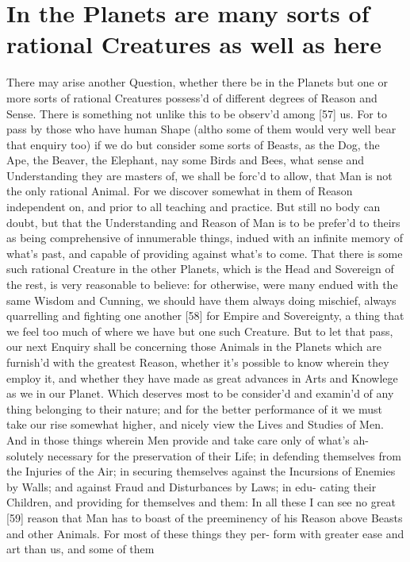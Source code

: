 \documentclass[letterpaper]{book}
\begin{document}
\section{In the Planets are many sorts of rational Creatures as well as here}

There may arise another Question, whether there be in the Planets but one or
more sorts of rational Creatures possess'd of different degrees of Reason
and Sense. There is something not unlike this to be observ'd among [57] us.
For to pass by those who have human Shape (altho some of them would very
well bear that enquiry too) if we do but consider some sorts of Beasts, as
the Dog, the Ape, the Beaver, the Elephant, nay some Birds and Bees, what
sense and Understanding they are masters of, we shall be forc'd to allow,
that Man is not the only rational Animal. For we discover somewhat in them
of Reason independent on, and prior to all teaching and practice.  But still
no body can doubt, but that the Understanding and Reason of Man is to be
prefer'd to theirs as being comprehensive of innumerable things, indued with
an infinite memory of what's past, and capable of providing against what's
to come. That there is some such rational Creature in the other Planets,
which is the Head and Sovereign of the rest, is very reasonable to believe:
for otherwise, were many endued with the same Wisdom and Cunning, we should
have them always doing mischief, always quarrelling and fighting one another
[58] for Empire and Sovereignty, a thing that we feel too much of where we
have but one such Creature. But to let that pass, our next Enquiry shall be
concerning those Animals in the Planets which are furnish'd with the
greatest Reason, whether it's possible to know wherein they employ it, and
whether they have made as great advances in Arts and Knowlege as we in our
Planet. Which deserves most to be consider'd and examin'd of any thing
belonging to their nature; and for the better performance of it we must take
our rise somewhat higher, and nicely view the Lives and Studies of Men.  And
in those things wherein Men provide and take care only of what's ah-
solutely necessary for the preservation of their Life; in defending
themselves from the Injuries of the Air; in securing themselves against the
Incursions of Enemies by Walls; and against Fraud and Disturbances by Laws;
in edu- cating their Children, and providing for themselves and them: In all
these I can see no great [59] reason that Man has to boast of the
preeminency of his Reason above Beasts and other Animals. For most of these
things they per- form with greater ease and art than us, and some of them
\end{document}
